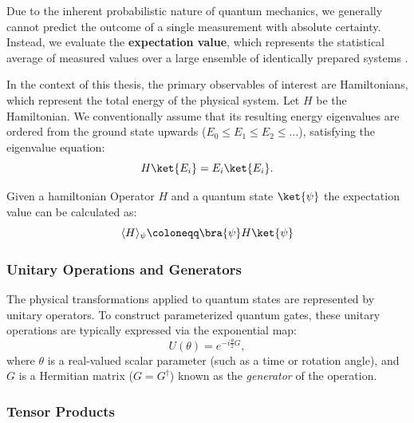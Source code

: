 Due to the inherent probabilistic nature of quantum mechanics, we generally cannot predict the outcome of a single measurement with absolute certainty. Instead, we evaluate the \textbf{expectation value}, which represents the statistical average of measured values over a large ensemble of identically prepared systems \cite[p. 23]{sakurai2020modern}.

In the context of this thesis, the primary observables of interest are Hamiltonians, which represent the total energy of the physical system. Let $H$ be the Hamiltonian. We conventionally assume that its resulting energy eigenvalues are ordered from the ground state upwards ($E_0 \le E_1 \le E_2 \le \dots$), satisfying the eigenvalue equation:
\begin{equation}
    H \ket{E_i} = E_i \ket{E_i}.
\end{equation}

Given a hamiltonian Operator $H$ and a quantum state $\ket{\psi}$ the expectation value can be calculated as:
\begin{equation}
    \langle H\rangle _{\psi} \coloneqq \bra{\psi} H \ket    {\psi}
\end{equation}
\cite[p.42]{Kottmann2025}

\subsubsection{Unitary Operations and Generators}
The physical transformations applied to quantum states are represented by unitary operators. To construct parameterized quantum gates, these unitary operations are typically expressed via the exponential map:
\begin{equation}
    \label{unitary_operation}
    U(\theta) = e^{-i\frac{\theta}{2}G},
\end{equation}
where $\theta$ is a real-valued scalar parameter (such as a time or rotation angle), and $G$ is a Hermitian matrix ($G = G^\dagger$) known as the \textit{generator} of the operation.
\cite[p.34, 39]{Kottmann2025} \cite[p.1]{kottmann2020feasible}

\subsubsection{Tensor Products}




\cite[chapter 7.7.1]{sakurai2020modern}

